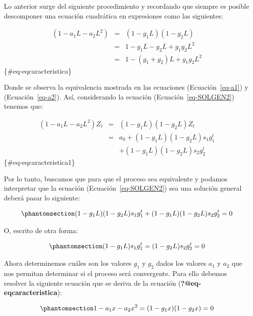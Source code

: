 \documentclass[
  a4paper,
]{article}
\begin{document}
Lo anterior surge del siguiente procedimiento y recordando que siempre
es posible descomponer una ecuación cuadrática en expresiones como las
siguientes:

\begin{eqnarray}
    (1 - a_1 L - a_2 L^2) & = & (1 - g_1 L)(1 - g_2 L) \nonumber \\
    & = & 1 - g_1 L - g_2 L + g_1 g_2 L^2 \nonumber \\
    & = & 1 - (g_1 + g_2) L + g_1 g_2 L^2
\end{eqnarray} \{\#eq-eqcaracteristica\}

Donde se observa la equivalencia mostrada en las ecuaciones
(Ecuación~\ref{eq-a1}) y (Ecuación~\ref{eq-a2}). Así, considerando la
ecuación (Ecuación~\ref{eq-SOLGEN2}) tenemos que:

\begin{eqnarray}
    (1 - a_1 L - a_2 L^2) Z_t & = & (1 - g_1 L)(1 - g_2 L) Z_t \nonumber \\
    & = & a_0 + (1 - g_1 L)(1 - g_2 L) s_1 g^t_1 \nonumber \\
    &  & + (1 - g_1 L)(1 - g_2 L) s_2 g^t_2
\end{eqnarray} \{\#eq-eqcaracteristica1\}

Por lo tanto, buscamos que para que el proceso sea equivalente y podamos
interpretar que la ecuación (Ecuación~\ref{eq-SOLGEN2}) sea una solución
general deberá pasar lo siguiente:

\begin{equation}\phantomsection\label{eq-eqcaracteristica2}{
    (1 - g_1 L) (1 - g_2 L) s_1 g^t_1 + (1 - g_1 L) (1 - g_2 L) s_2 g^t_2 = 0
}\end{equation}

O, escrito de otra forma:

\begin{equation}\phantomsection\label{eq-eqcaracteristica3}{
    (1 - g_1 L) s_1 g^t_1 = (1 - g_2 L) s_2 g^t_2 = 0
}\end{equation}

Ahora determinemos cuáles son los valores \(g_1\) y \(g_2\) dados los
valores \(a_1\) y \(a_2\) que nos permitan determinar si el proceso será
convergente. Para ello debemos resolver la siguiente ecuación que se
deriva de la ecuación (\textbf{?@eq-eqcaracteristica}):

\begin{equation}\phantomsection\label{eq-eqcaracteristica4}{
    1 - a_1 x - a_2 x^2 = (1 - g_1 x)(1 - g_2 x) = 0
}\end{equation}
\end{document}
